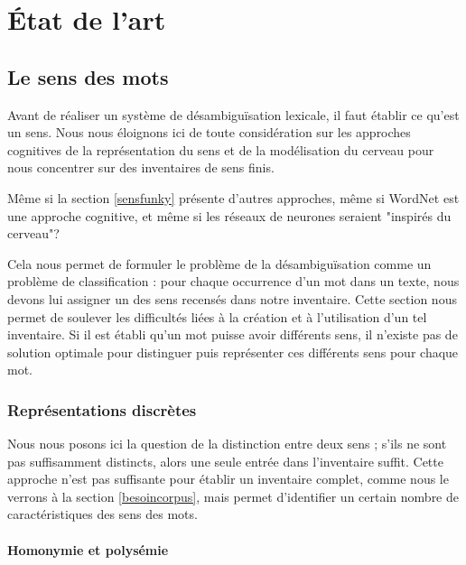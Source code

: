 \chapter{État de l'art} 
\label{ch:etatdelart} 

\section{Le sens des mots}

Avant de réaliser un système de désambiguïsation lexicale, il faut établir ce
qu'est un sens. Nous nous éloignons ici de toute considération sur les
approches cognitives de la représentation du sens et de la modélisation du
cerveau \citep{harnad1990symbol} pour nous concentrer sur des inventaires de
sens finis.


Même si la section \ref{sensfunky} présente d'autres approches, même si WordNet
est une approche cognitive, et même si les réseaux de neurones seraient
"inspirés du cerveau"?

Cela nous permet de formuler le problème de la
désambiguïsation comme un problème de classification : pour chaque occurrence
d'un mot dans un texte, nous devons lui assigner un des sens recensés dans
notre inventaire. Cette section nous permet de soulever les difficultés liées à
la création et à l'utilisation d'un tel inventaire. Si il est établi qu'un mot
puisse avoir différents sens, il n'existe pas de solution optimale pour
distinguer puis représenter ces différents sens pour chaque mot.

\subsection{Représentations discrètes}

Nous nous posons ici la question de la distinction entre deux sens ; s'ils ne
sont pas suffisamment distincts, alors une seule entrée dans l'inventaire
suffit. Cette approche n'est pas suffisante pour établir un inventaire complet,
comme nous le verrons à la section \ref{besoincorpus}, mais permet d'identifier
un certain nombre de caractéristiques des sens des mots.

\subsubsection{Homonymie et polysémie}

